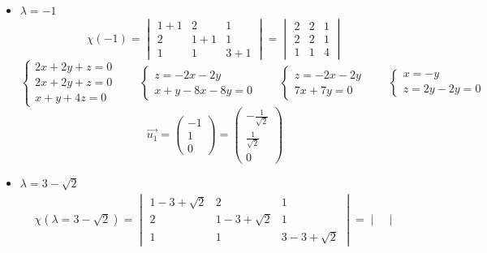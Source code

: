 \begin{itemize}
	\item $ \lambda = -1 $
    $$ \chi(-1) =
    \begin{vmatrix}
    	1 + 1 & 2 & 1 \\
        2 & 1 + 1 & 1 \\
        1 & 1 & 3 + 1
    \end{vmatrix} =
    \begin{vmatrix}
    	2 & 2 & 1 \\
        2 & 2 & 1 \\
        1 & 1 & 4
    \end{vmatrix} $$
    $$
    \begin{cases}
    	2x + 2y + z = 0 \\
        2x + 2y + z = 0 \\
        x + y + 4z = 0
    \end{cases} \qquad
    \begin{cases}
    	z = -2x - 2y \\
        x + y - 8x - 8y = 0
    \end{cases} \qquad
    \begin{cases}
    	z = -2x - 2y \\
        7x + 7y = 0
    \end{cases} \qquad
    \begin{cases}
    	x = -y \\
        z = 2y - 2y = 0
    \end{cases} $$
    $$ \vec{u_1} =
    \begin{pmatrix}
        -1 \\
        1 \\
        0
    \end{pmatrix} =
    \begin{pmatrix}
        -\frac1{\sqrt2} \\
        \frac1{\sqrt2} \\
        0
    \end{pmatrix} $$
    \item $ \lambda = 3 - \sqrt2 $
    \begin{multline*}
        \chi(\lambda = 3 - \sqrt2) =
        \begin{vmatrix}
            1 - 3 + \sqrt2 & 2 & 1 \\
            2 & 1 - 3 + \sqrt2 & 1 \\
            1 & 1 & 3 - 3 + \sqrt2
        \end{vmatrix} =
        \begin{vmatrix}

\end{vmatrix}
\end{multline*}
\end{itemize}
